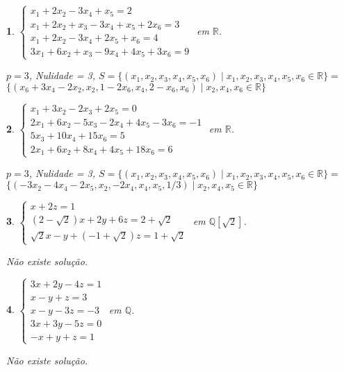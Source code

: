 \documentclass[12pt]{exam}
\newtheorem{exercicio}{}
\newcommand{\rac}{\mathbb{Q}}
\newcommand{\real}{\mathbb{R}}
\begin{document}
\begin{exercicio}
  $\begin{cases}
    x_1 + 2x_2 - 3x_4 + x_5 = 2\\
    x_1 + 2x_2 + x_3 - 3x_4 + x_5 + 2x_6 = 3\\
    x_1 + 2x_2 - 3x_4 + 2x_5 + x_6 = 4\\
    3x_1 + 6x_2 + x_3 - 9x_4 + 4x_5 + 3x_6 = 9
  \end{cases}$ em $\real$.
  \begin{solucao}
    $p = 3$, Nulidade = 3, $S = \{(x_1, x_2, x_3, x_4, x_5, x_6) \mid x_1, x_2, x_3, x_4, x_5, x_6 \in \real\} = $\\ $\{(x_6 + 3x_4 - 2x_2, x_2, 1 - 2x_6, x_4, 2 - x_6, x_6) \mid x_2, x_4, x_6 \in \real\}$
  \end{solucao}
\end{exercicio}

\begin{exercicio}
  $\begin{cases}
    x_1 + 3x_2 - 2x_3 + 2x_5 = 0\\
    2x_1 + 6x_2 - 5x_3 - 2x_4 + 4x_5 - 3x_6 = -1\\
    5x_3 + 10x_4 + 15x_6 = 5\\
    2x_1 + 6x_2 + 8x_4 + 4x_5 + 18x_6 = 6
  \end{cases}$ em $\real$.
  \begin{solucao}
    $p = 3$, Nulidade = 3, $S = \{(x_1, x_2, x_3, x_4, x_5, x_6) \mid x_1, x_2, x_3, x_4, x_5, x_6 \in \real\} = $\\ $\{(-3x_2 - 4x_4 - 2x_5, x_2, -2x_4, x_4, x_5, 1/3) \mid x_2, x_4, x_5 \in \real\}$
  \end{solucao}
\end{exercicio}

\begin{exercicio}
  $\begin{cases}
    x + 2z = 1\\
    (2 - \sqrt{2})x + 2y + 6z = 2 + \sqrt{2}\\
    \sqrt{2}x - y + (-1 + \sqrt{2})z = 1 + \sqrt{2}
  \end{cases}$ em $\rac[\sqrt{2}]$.
  \begin{solucao}
    N\~ao existe solu\c{c}\~ao.
  \end{solucao}
\end{exercicio}


\begin{exercicio}\label{sistemalinearfim}
  $\begin{cases}
    3x + 2y - 4z = 1\\
    x - y + z = 3\\
    x - y - 3z = -3\\
    3x + 3y - 5z =0\\
    -x + y + z = 1
  \end{cases}$ em $\rac$.
\begin{solucao}
  N\~ao existe solu\c{c}\~ao.
\end{solucao}
\end{exercicio}
\end{document}
